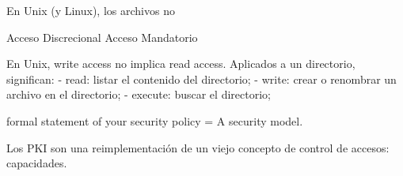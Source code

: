 \documentclass{article}
\theoremstyle{definition}
\begin{document}
En Unix (y Linux), los archivos no


Acceso Discrecional
Acceso Mandatorio

En Unix, write access no implica read access. Aplicados a un directorio,
significan:
- read: listar el contenido del directorio;
- write: crear o renombrar un archivo en el directorio;
- execute: buscar el directorio;

formal statement of your security policy = A security model.

Los PKI son una reimplementación de un viejo concepto de control de accesos:
capacidades.

\fi

\end{document}
